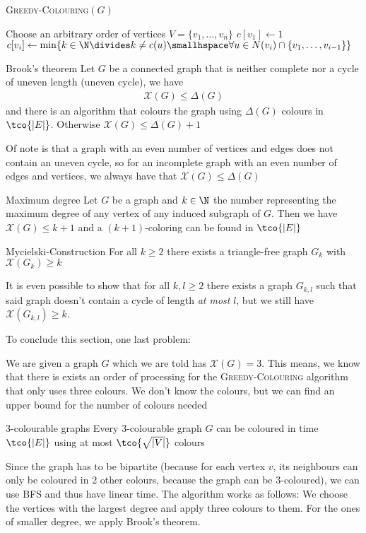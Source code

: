 \begin{algorithm}
    \caption{\textsc{Greedy-Colouring}$(G)$}
    \begin{algorithmic}[1]
        \State Choose an arbitrary order of vertices $V = \{v_1, \ldots, v_n\}$
        \State $c[v_1] \gets 1$
            \State $c[v_i] \gets \min \{k \in \N \divides k \neq c(u) \smallhspace \forall u \in N(v_i) \cap \{v_1, \ldots, v_{i - 1}\}\}$ 
        \EndFor
    \end{algorithmic}
\end{algorithm}

\begin{theorem}[]{Brook's theorem}
    Let $G$ be a connected graph that is neither complete nor a cycle of uneven length (uneven cycle), we have
    \begin{align*}
        \mathscr{X}(G) \leq \Delta(G)
    \end{align*}
    and there is an algorithm that colours the graph using $\Delta(G)$ colours in $\tco{|E|}$. Otherwise $\mathscr{X}(G) \leq \Delta(G) + 1$
\end{theorem}
Of note is that a graph with an even number of vertices and edges does not contain an uneven cycle, so for an incomplete graph with an even number of edges and vertices, we always have that $\mathscr{X}(G) \leq \Delta(G)$

\begin{theorem}[]{Maximum degree}
    Let $G$ be a graph and $k \in \N$ the number representing the maximum degree of any vertex of any induced subgraph of $G$. Then we have $\mathscr{X}(G) \leq k + 1$ and a $(k + 1)$-coloring can be found in $\tco{|E|}$
\end{theorem}

\begin{theorem}[]{Mycielski-Construction}
    For all $k \geq 2$ there exists a triangle-free graph $G_k$ with $\mathscr{X}(G_k) \geq k$
\end{theorem}
It is even possible to show that for all $k, l \geq 2$ there exists a graph $G_{k, l}$ such that said graph doesn't contain a cycle of length \textit{at most} $l$, but we still have $\mathscr{X}(G_{k, l}) \geq k$.

To conclude this section, one last problem:

We are given a graph $G$ which we are told has $\mathscr{X}(G) = 3$. This means, we know that there is exists an order of processing for the \textsc{Greedy-Colouring} algorithm that only uses three colours. We don't know the colours, but we can find an upper bound for the number of colours needed
\begin{theorem}[]{$3$-colourable graphs}
    Every $3$-colourable graph $G$ can be coloured in time $\tco{|E|}$ using at most $\tco{\sqrt{|V|}}$ colours
\end{theorem}
Since the graph has to be bipartite (because for each vertex $v$, its neighbours can only be coloured in $2$ other colours, because the graph can be $3$-coloured), we can use BFS and thus have linear time. The algorithm works as follows: We choose the vertices with the largest degree and apply three colours to them. For the ones of smaller degree, we apply Brook's theorem.
